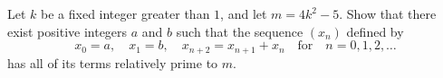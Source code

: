 Let $k$ be a fixed integer greater than $1$, and let $m = 4k^2 - 5$. Show that there exist positive integers $a$ and $b$ such that the sequence $(x_n)$ defined by
\[
x_0 = a, \quad x_1 = b, \quad x_{n+2} = x_{n+1} + x_n \quad \text{for} \quad n = 0, 1, 2, \ldots
\]
has all of its terms relatively prime to $m$.
